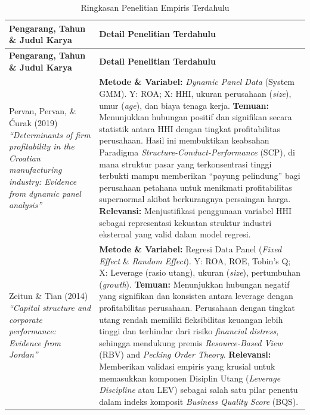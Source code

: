 \documentclass[12pt,a4paper]{article}
\begin{document}
\begin{longtable}{>{\raggedright\arraybackslash}p{} >{\raggedright\arraybackslash}p{}}
\caption{Ringkasan Penelitian Empiris Terdahulu}\label{tab:ringkasan-penelitian-terdahulu}\\
\toprule
\textbf{Pengarang, Tahun \& Judul Karya} & \textbf{Detail Penelitian Terdahulu} \\
\midrule
\endfirsthead
\toprule
\textbf{Pengarang, Tahun \& Judul Karya} & \textbf{Detail Penelitian Terdahulu} \\
\midrule
\endhead
Pervan, Pervan, \& Ćurak (2019) \newline \textit{``Determinants of firm profitability in the Croatian manufacturing industry: Evidence from dynamic panel analysis''} &
\textbf{Metode \& Variabel:} \textit{Dynamic Panel Data} (System GMM). Y: ROA; X: HHI, ukuran perusahaan (\textit{size}), umur (\textit{age}), dan biaya tenaga kerja. \newline
\textbf{Temuan:} Menunjukkan hubungan positif dan signifikan secara statistik antara HHI dengan tingkat profitabilitas perusahaan. Hasil ini membuktikan keabsahan Paradigma \textit{Structure-Conduct-Performance} (SCP), di mana struktur pasar yang terkonsentrasi tinggi terbukti mampu memberikan ``payung pelindung'' bagi perusahaan petahana untuk menikmati profitabilitas supernormal akibat berkurangnya persaingan harga. \newline
\textbf{Relevansi:} Menjustifikasi penggunaan variabel HHI sebagai representasi kekuatan struktur industri eksternal yang valid dalam model regresi. \\
\midrule
Zeitun \& Tian (2014) \newline \textit{``Capital structure and corporate performance: Evidence from Jordan''} &
\textbf{Metode \& Variabel:} Regresi Data Panel (\textit{Fixed Effect} \& \textit{Random Effect}). Y: ROA, ROE, Tobin's Q; X: Leverage (rasio utang), ukuran (\textit{size}), pertumbuhan (\textit{growth}). \newline
\textbf{Temuan:} Menunjukkan hubungan negatif yang signifikan dan konsisten antara leverage dengan profitabilitas perusahaan. Perusahaan dengan tingkat utang rendah memiliki fleksibilitas keuangan lebih tinggi dan terhindar dari risiko \textit{financial distress}, sehingga mendukung premis \textit{Resource-Based View} (RBV) and \textit{Pecking Order Theory}. \newline
\textbf{Relevansi:} Memberikan validasi empiris yang krusial untuk memasukkan komponen Disiplin Utang (\textit{Leverage Discipline} atau LEV) sebagai salah satu pilar penentu dalam indeks komposit \textit{Business Quality Score} (BQS). \\

\end{longtable}
\end{document}
